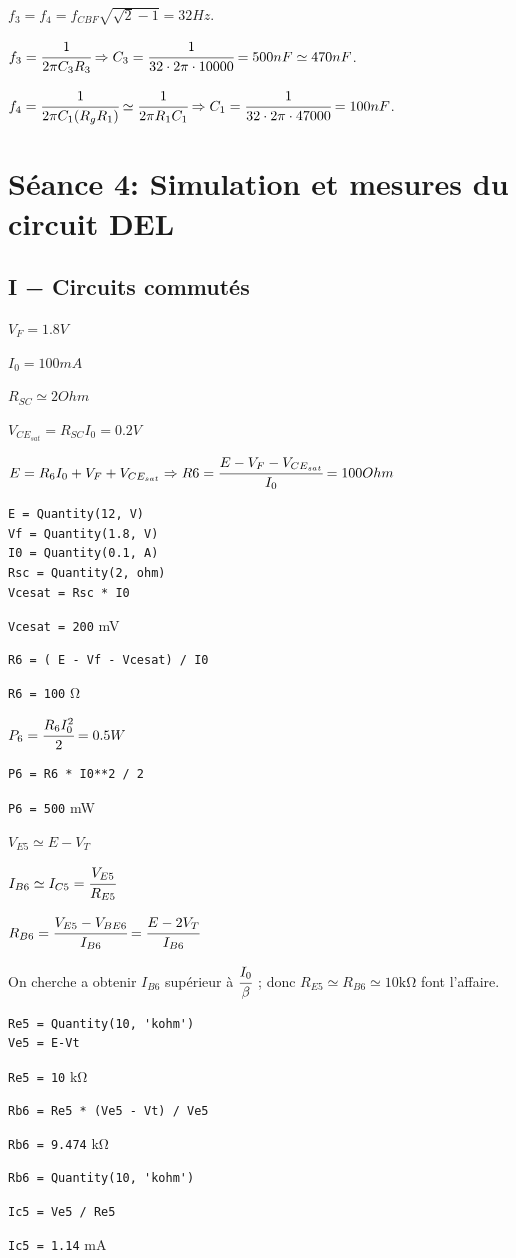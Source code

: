 $f_3 = f_4 = f_{CBF}\sqrt{\sqrt{2}-1} = 32 Hz$.

$f_3 = \cfrac{1}{2\pi C_3R_3} \Rightarrow C_3 = \cfrac{1}{32 \cdot 2 \pi \cdot 10000} = 500nF \simeq 470 nF$.

$f_4 = \cfrac{1}{2\pi C_1 (R_gR_1)} \simeq \cfrac{1}{2\pi R_1C_1} \Rightarrow C_1 = \cfrac{1}{32 \cdot 2 \pi \cdot 47000} = 100nF$.
\section{Séance 4: Simulation et mesures du circuit DEL}
\subsection{I − Circuits commutés}

$V_F=1.8V$

$I_0=100mA$

$R_{SC}\simeq 2Ohm$

$V_{CE_{sat}}=R_{SC}I_0=0.2V$

$E=R_6I_0+V_F+V_{CE_{sat}}\Rightarrow R6=\cfrac{E-V_F-V_{CE_{sat}}}{I_0}=100Ohm$
\begin{verbatim}
E = Quantity(12, V)
Vf = Quantity(1.8, V)
I0 = Quantity(0.1, A)
Rsc = Quantity(2, ohm)
Vcesat = Rsc * I0
\end{verbatim}
\verb|Vcesat = 200| \si{\milli\volt}
\begin{verbatim}
R6 = ( E - Vf - Vcesat) / I0
\end{verbatim}
\verb|R6 = 100| \si\ohm

$P_6=\cfrac{R_6I_0^2}{2}=0.5W$
\begin{verbatim}
P6 = R6 * I0**2 / 2
\end{verbatim}
\verb|P6 = 500| \si{\milli\watt}

$V_{E5}\simeq E-V_T$

$I_{B6}\simeq I_{C5}=\cfrac{V_{E5}}{R_{E5}}$

$R_{B6}=\cfrac{V_{E5}-V_{BE6}}{I_{B6}}=\cfrac{E-2V_T}{I_{B6}}$

On cherche a obtenir $I_{B6}$ supérieur à $\cfrac{I_0}{\beta}$ ; donc $R_{E5}\simeq R_{B6}\simeq 10\si{\kilo\ohm}$ font l’affaire.
\begin{verbatim}
Re5 = Quantity(10, 'kohm')
Ve5 = E-Vt
\end{verbatim}
\verb|Re5 = 10| \si{\kilo\ohm}
\begin{verbatim}
Rb6 = Re5 * (Ve5 - Vt) / Ve5
\end{verbatim}
\verb|Rb6 = 9.474| \si{\kilo\ohm}
\begin{verbatim}
Rb6 = Quantity(10, 'kohm')
\end{verbatim}
\begin{verbatim}
Ic5 = Ve5 / Re5
\end{verbatim}
\verb|Ic5 = 1.14| \si{\milli\ampere}

